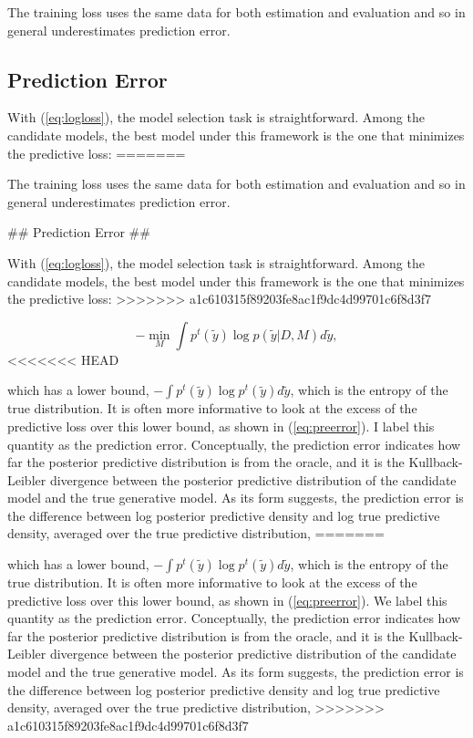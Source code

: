 \documentclass[11pt,article,oneside]{memoir}
\begin{document}
The training loss uses the same data for both estimation and evaluation
and so in general underestimates prediction error.

\subsection{Prediction Error}\label{prediction-error}

With (\ref{eq:logloss}), the model selection task is straightforward.
Among the candidate models, the best model under this framework is the
one that minimizes the predictive loss:
=======
  
The training loss uses the same data for both estimation and evaluation and so
in general underestimates prediction error.

## Prediction Error ##

With (\ref{eq:logloss}), the model selection task is straightforward. Among the
candidate models, the best model under this framework is the one that minimizes
the predictive loss:
>>>>>>> a1c610315f89203fe8ac1f9dc4d99701c6f8d3f7

\begin{equation}
  \label{eq:minimizer}
  - \min_{M} \int \!p^t(\tilde y) \log p(\tilde y|D, M) d\tilde y,
  \end{equation}
<<<<<<< HEAD

which has a lower bound,
\(-\!\int\! p^t(\tilde y) \log p^t(\tilde y) d\tilde y\), which is the
entropy of the true distribution. It is often more informative to look
at the excess of the predictive loss over this lower bound, as shown in
(\ref{eq:preerror}). I label this quantity as the prediction error.
Conceptually, the prediction error indicates how far the posterior
predictive distribution is from the oracle, and it is the
Kullback-Leibler divergence between the posterior predictive
distribution of the candidate model and the true generative model. As
its form suggests, the prediction error is the difference between log
posterior predictive density and log true predictive density, averaged
over the true predictive distribution,
=======
  
which has a lower bound, $-\!\int\! p^t(\tilde y) \log p^t(\tilde y) d\tilde y$,
which is the entropy of the true distribution. It is often more informative to
look at the excess of the predictive loss over this lower bound, as shown in
(\ref{eq:preerror}). We label this quantity as the prediction
error. Conceptually, the prediction error indicates how far the posterior
predictive distribution is from the oracle, and it is the Kullback-Leibler
divergence between the posterior predictive distribution of the candidate model
and the true generative model. As its form suggests, the prediction error is the
difference between log posterior predictive density and log true predictive
density, averaged over the true predictive distribution,
>>>>>>> a1c610315f89203fe8ac1f9dc4d99701c6f8d3f7
\end{document}
